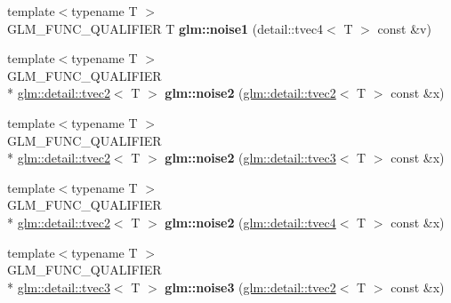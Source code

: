 \begin{DoxyCompactItemize}
\item 
\hypertarget{namespaceglm_a2266131ab15c73090fd07186ad8bccf4}{{\footnotesize template$<$typename T $>$ }\\G\-L\-M\-\_\-\-F\-U\-N\-C\-\_\-\-Q\-U\-A\-L\-I\-F\-I\-E\-R T {\bfseries glm\-::noise1} (detail\-::tvec4$<$ T $>$ const \&v)}\label{namespaceglm_a2266131ab15c73090fd07186ad8bccf4}

\item 
\hypertarget{namespaceglm_a613ad9c9a0caaca594321e107ffe7b54}{{\footnotesize template$<$typename T $>$ }\\G\-L\-M\-\_\-\-F\-U\-N\-C\-\_\-\-Q\-U\-A\-L\-I\-F\-I\-E\-R \\*
\hyperlink{structglm_1_1detail_1_1tvec2}{glm\-::detail\-::tvec2}$<$ T $>$ {\bfseries glm\-::noise2} (\hyperlink{structglm_1_1detail_1_1tvec2}{glm\-::detail\-::tvec2}$<$ T $>$ const \&x)}\label{namespaceglm_a613ad9c9a0caaca594321e107ffe7b54}

\item 
\hypertarget{namespaceglm_a1c398318263d9bd2ae0f5cf12aaa1b28}{{\footnotesize template$<$typename T $>$ }\\G\-L\-M\-\_\-\-F\-U\-N\-C\-\_\-\-Q\-U\-A\-L\-I\-F\-I\-E\-R \\*
\hyperlink{structglm_1_1detail_1_1tvec2}{glm\-::detail\-::tvec2}$<$ T $>$ {\bfseries glm\-::noise2} (\hyperlink{structglm_1_1detail_1_1tvec3}{glm\-::detail\-::tvec3}$<$ T $>$ const \&x)}\label{namespaceglm_a1c398318263d9bd2ae0f5cf12aaa1b28}

\item 
\hypertarget{namespaceglm_a1a6474cddee1470476771ba4e087b9e1}{{\footnotesize template$<$typename T $>$ }\\G\-L\-M\-\_\-\-F\-U\-N\-C\-\_\-\-Q\-U\-A\-L\-I\-F\-I\-E\-R \\*
\hyperlink{structglm_1_1detail_1_1tvec2}{glm\-::detail\-::tvec2}$<$ T $>$ {\bfseries glm\-::noise2} (\hyperlink{structglm_1_1detail_1_1tvec4}{glm\-::detail\-::tvec4}$<$ T $>$ const \&x)}\label{namespaceglm_a1a6474cddee1470476771ba4e087b9e1}

\item 
\hypertarget{namespaceglm_ae13deb2380745fdaed257f28f0a0833d}{{\footnotesize template$<$typename T $>$ }\\G\-L\-M\-\_\-\-F\-U\-N\-C\-\_\-\-Q\-U\-A\-L\-I\-F\-I\-E\-R \\*
\hyperlink{structglm_1_1detail_1_1tvec3}{glm\-::detail\-::tvec3}$<$ T $>$ {\bfseries glm\-::noise3} (\hyperlink{structglm_1_1detail_1_1tvec2}{glm\-::detail\-::tvec2}$<$ T $>$ const \&x)}\label{namespaceglm_ae13deb2380745fdaed257f28f0a0833d}


\end{DoxyCompactItemize}
